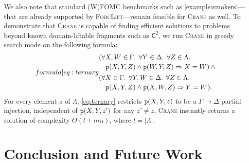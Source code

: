 \documentclass{article}
\newcommand{\Ctwo}{$\mathsf{C}^{2}$}
\newcommand{\predicate}{\texttt{\textup{p}}}
\begin{document}
We also note that standard (W)FOMC benchmarks such as
\cref{example:smokers}---that are already supported by
\textsc{ForcLift}---remain feasible for \textsc{Crane} as well. To demonstrate
that \textsc{Crane} is capable of finding efficient solutions to problems beyond
known domain-liftable fragments such as \Ctwo{}, we run \textsc{Crane} in greedy
search mode on the following formula:
\begin{equation}\label[formula]{eq:ternary}
  \begin{split}
    &\begin{multlined}[t]
      (\forall X,W \in \Gamma\text{. }\forall Y \in \Delta\text{. }\forall Z \in \Lambda\text{. }\\
      \predicate(X, Y, Z) \land \predicate(W, Y, Z) \Rightarrow X = W) \land{}
    \end{multlined}\\
    &\begin{multlined}[t]
      (\forall X \in \Gamma\text{. }\forall Y,W \in \Delta\text{. }\forall Z \in \Lambda\text{. }\\
      \predicate(X, Y, Z) \land \predicate(X, W, Z) \Rightarrow Y = W).
    \end{multlined}
  \end{split}
\end{equation}
For every element $z$ of $\Lambda$, \cref{eq:ternary} restricts
$\predicate(X, Y, z)$ to be a $\Gamma \to \Delta$ partial injection, independent
of $\predicate(X, Y, z')$ for any $z' \ne z$. \textsc{Crane} instantly returns a
solution of complexity $\Theta(l+mn)$, where $l = |\Lambda|$.

\section{Conclusion and Future Work}\label{sec:conclusion}
\setlength{\multlinegap}{0pt}
\end{document}
